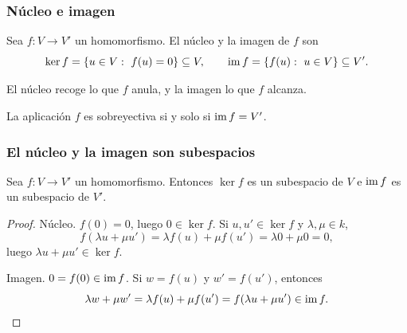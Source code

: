 
\begin{frame}
    \frametitle{Núcleo e imagen}

    \begin{definition}
        Sea $f\colon V\to V'$ un homomorfismo. El \alert{núcleo} y la
        \alert{imagen} de $f$ son
        \[
            \ker f=\{u\in V:\ f(u)=0\}\subseteq V,
            \qquad
            \operatorname{im} f=\{f(u):\ u\in V\}\subseteq V'.
        \]
    \end{definition}

    \medskip

    El núcleo recoge lo que $f$ \alert{anula}, y la imagen lo que $f$
    \alert{alcanza}.

    \medskip

    La aplicación $f$ es sobreyectiva si y solo si $\operatorname{im} f=V'$.
\end{frame}


\begin{frame}
    \frametitle{El núcleo y la imagen son subespacios}

    \begin{proposition}
        Sea $f\colon V\to V'$ un homomorfismo. Entonces $\ker f$ es un
        subespacio de $V$ e $\operatorname{im} f$ es un subespacio de $V'$.
    \end{proposition}

    \begin{proof}
        \alert{Núcleo.} $f(0)=0$, luego $0\in\ker f$. Si $u,u'\in\ker f$ y
        $\lambda,\mu\in k$,
        \[
            f(\lambda u+\mu u')=\lambda f(u)+\mu f(u')=\lambda 0+\mu 0=0,
        \]
        luego $\lambda u+\mu u'\in\ker f$.

        \medskip

        \alert{Imagen.} $0=f(0)\in\operatorname{im} f$. Si $w=f(u)$ y $w'=f(u')$,
        entonces
        \[
            \lambda w+\mu w'=\lambda f(u)+\mu f(u')=f(\lambda u+\mu u')\in\operatorname{im} f.\qedhere
        \]
    \end{proof}
\end{frame}


